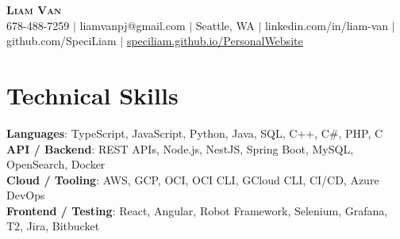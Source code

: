 \documentclass[letterpaper,11pt]{article}
\begin{document}

%
\begin{center}
    \textbf{\Huge \scshape Liam Van} \\ \vspace{1pt}
    \small 678-488-7259 $|$ \small {liamvanpj@gmail.com} $|$ Seattle, WA
 {{$|$ linkedin.com/in/liam-van} {$|$ github.com/SpeciLiam} {$|$ \href{https://speciliam.github.io/PersonalWebsite}{speciliam.github.io/PersonalWebsite}}}

\end{center}

\section{Technical Skills}
 \begin{itemize}[leftmargin=0.15in, label={}]
    \small{\item{
     \textbf{Languages}{: TypeScript, JavaScript, Python, Java, SQL, C++, C\#, PHP, C} \\
     \textbf{API / Backend}{: REST APIs, Node.js, NestJS, Spring Boot, MySQL, OpenSearch, Docker} \\
     \textbf{Cloud / Tooling}{: AWS, GCP, OCI, OCI CLI, GCloud CLI, CI/CD, Azure DevOps} \\
     \textbf{Frontend / Testing}{: React, Angular, Robot Framework, Selenium, Grafana, T2, Jira, Bitbucket} \\
    }}
 \end{itemize}
%
\end{document}
